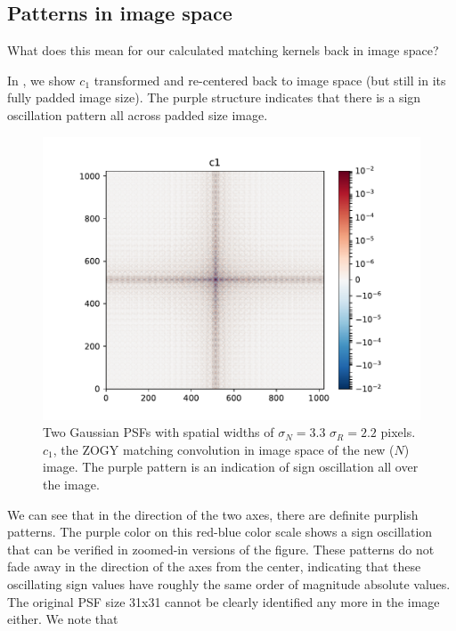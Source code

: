\subsection{Patterns in image space\label{sec:patterns}}
\par What does this mean for our calculated matching kernels back in
image space?
%
\par In , we show \(c_1\) transformed and
re-centered back to image space (but still in its fully padded image
size). The purple structure indicates that there is a sign oscillation
pattern all across padded size image.
\begin{figure}
\begin{center}
\includegraphics[width=5.5in]{fig/twoG_defaults_c1.pdf}
\end{center}
\caption{\label{fig:twoG_c1}Two Gaussian PSFs with spatial widths of \(\sigma_N = 3.3\)
  \(\sigma_R = 2.2\) pixels. \(c_1\), the ZOGY matching convolution in image space
  of the new (\(N\)) image. The purple pattern is an indication of
  sign oscillation all over the image.}
\end{figure}
%
\par We can see that in the direction of the two axes, there are definite
purplish patterns. The purple color on this red-blue color scale shows a
sign oscillation that can be verified in zoomed-in versions of the
figure. These patterns do not fade away in the direction of the axes from
the center, indicating that these oscillating sign values have roughly the
same order of magnitude absolute values. The original PSF size 31x31 cannot
be clearly identified any more in the image either. We note that
